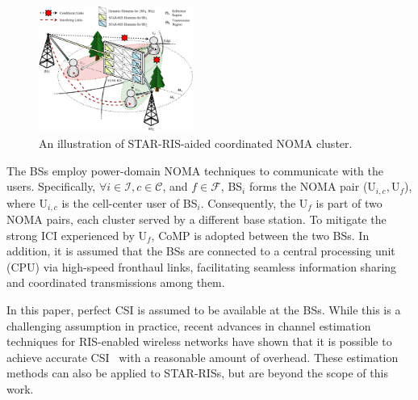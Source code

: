\documentclass[conference]{IEEEtran}
\begin{document}
\begin{figure}[t]
    \centerline{
        \includegraphics[width=0.45\textwidth]{figs/system.pdf}}
    \caption{An illustration of STAR-RIS-aided coordinated NOMA cluster.}
    \label{fig:system}
\end{figure}

The BSs employ power-domain NOMA techniques to communicate with the users. Specifically, $\forall i \in \mathcal{I}, c \in \mathcal{C}$, and $f \in \mathcal{F}$, BS$_i$ forms the NOMA pair (${\text{U}_{i,c}, \text{U}_f}$), where $\text{U}_{i,c}$ is the cell-center user of BS$_i$. Consequently, the U$_f$ is part of two NOMA pairs, each cluster served by a different base station. To mitigate the strong ICI experienced by U$_f$, CoMP is adopted between the two BSs. In addition, it is assumed that the BSs are connected to a central processing unit (CPU) via high-speed fronthaul links, facilitating seamless information sharing and coordinated transmissions among them.

In this paper, perfect CSI is assumed to be available at the BSs. While this is a challenging assumption in practice, recent advances in channel estimation techniques for RIS-enabled wireless networks have shown that it is possible to achieve accurate CSI~\cite{hou2021joint, wei2021channel, taha2021enabling} with a reasonable amount of overhead. These estimation methods can also be applied to STAR-RISs, but are beyond the scope of this work.
\end{document}
